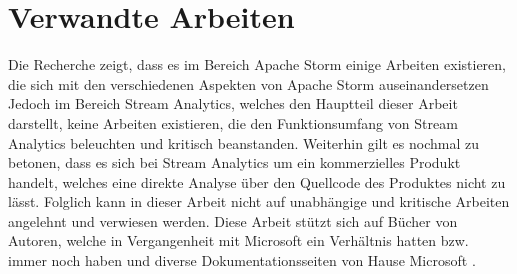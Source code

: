 \section{Verwandte Arbeiten}
Die Recherche zeigt, dass es im Bereich Apache Storm einige Arbeiten existieren, die sich mit den verschiedenen Aspekten von Apache Storm auseinandersetzen Jedoch im Bereich Stream Analytics, welches den Hauptteil dieser Arbeit darstellt, keine Arbeiten existieren, die den Funktionsumfang von Stream Analytics beleuchten und kritisch beanstanden. Weiterhin gilt es nochmal zu betonen, dass es sich bei Stream Analytics um ein kommerzielles Produkt handelt, welches eine direkte Analyse über den Quellcode des Produktes nicht zu lässt. Folglich kann in dieser Arbeit nicht auf unabhängige und kritische Arbeiten angelehnt und verwiesen werden. Diese Arbeit stützt sich auf Bücher von Autoren, welche in Vergangenheit mit Microsoft ein Verhältnis hatten bzw. immer noch haben und diverse Dokumentationsseiten von Hause Microsoft \cite{Familiar.2017} \cite{Klein.2017}. 